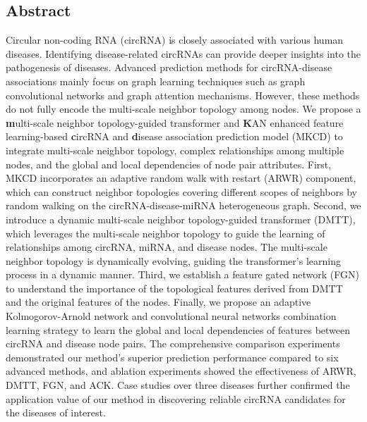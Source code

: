 \documentclass{bioinfo}
\begin{document}
\begin{methods}
\section{Abstract}
Circular non-coding RNA (circRNA) is closely associated with various human diseases. Identifying disease-related circRNAs can provide deeper insights into the pathogenesis of diseases. Advanced prediction methods for circRNA-disease associations mainly focus on graph learning techniques such as graph convolutional networks and graph attention mechanisms. However, these methods do not fully encode the multi-scale neighbor topology among nodes. We propose a \textbf{m}ulti-scale neighbor topology-guided transformer and \textbf{K}AN enhanced feature learning-based \textbf{c}ircRNA and \textbf{d}isease association prediction model (MKCD) to integrate multi-scale neighbor topology, complex relationships among multiple nodes, and the global and local dependencies of node pair attributes.
First, MKCD incorporates an adaptive random walk with restart (ARWR) component, which can construct neighbor topologies covering different scopes of neighbors by random walking on the circRNA-disease-miRNA heterogeneous graph. 
Second, we introduce a dynamic multi-scale neighbor topology-guided transformer (DMTT), which leverages the multi-scale neighbor topology to guide the learning of relationships among circRNA, miRNA, and disease nodes. The multi-scale neighbor topology is dynamically evolving, guiding the transformer's learning process in a dynamic manner.
Third, we establish a feature gated network (FGN) to understand the importance of the topological features derived from DMTT and the original features of the nodes.
Finally, we propose an adaptive Kolmogorov-Arnold network and convolutional neural networks combination learning strategy to learn the global and local dependencies of features between circRNA and disease node pairs. 
The comprehensive comparison experiments demonstrated our method's superior prediction performance compared to six advanced methods, and ablation experiments showed the effectiveness of ARWR, DMTT, FGN, and ACK. Case studies over three diseases further confirmed the application value of our method in discovering reliable circRNA candidates for the diseases of interest.




\end{methods}
\end{document}
